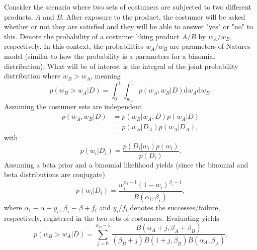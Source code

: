 \begin{example}
	Consider the scenario where two sets of costumers are subjected to two different products, $A$ and $B$. After exposure to the product, the costumer will be asked whether or not they are satisfied and they will be able to answer "yes" or "no" to this. Denote the probability of a costumer liking product $A/B$ by $w_A/w_B$, respectively. In this context, the probabilities $w_A/w_B$ are parameters of Natures model (similar to how the probability is a parameters for a binomial distribution). What will be of interest is the integral of the joint probability distribution where $w_B>w_A$, meaning
	\begin{equation}
		p(w_B > w_A|D)= \int_0^1\int_{w_A}^1p(w_A,w_B|D)\mathrm{d}w_A\mathrm{d}w_B.
		\label{e1}
	\end{equation}
	Assuming the costumer sets are independent
	\begin{equation}
		\begin{split}
			p(w_A,w_B|D) &= p(w_B|w_A,D)p(w_A|D)\\
			& = p(w_B|D_A)p(w_A|D_A),
		\end{split}
	\end{equation}
	with
	\begin{equation}
		p(w_i|D_i)=\frac{p(D_i|w_i)p(w_i)}{p(D_i)}.
	\end{equation}
	Assuming a beta prior and a binomial likelihood yields (since the binomial and beta distributions are conjugate)
	\begin{equation}
		p(w_i|D_i)=\frac{w_i^{\alpha_i-1}(1-w_i)^{\beta_i-1}}{B(\alpha_i,\beta_i)},
	\end{equation}
	where $\alpha_i\equiv \alpha+y_i$, $\beta_i\equiv \beta+f_i$ and $y_i/f_i$ denotes the successes/failure, respectively, registered in the two sets of costumers. Evaluating  yields
	\begin{equation}
		p(w_B > w_A|D)= \sum_{j=0}^{\alpha_B-1}\frac{B(\alpha_A+j,\beta_A+\beta_B)}{(\beta_B+j)B(1+j,\beta_B)B(\alpha_A,\beta_A)}.
	\end{equation}
	
\end{example}